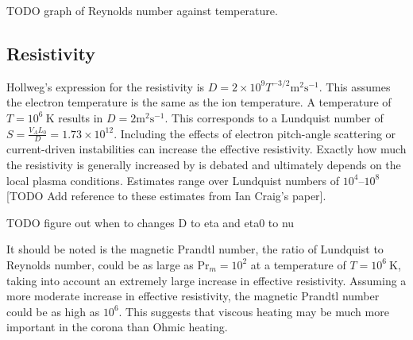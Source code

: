TODO graph of Reynolds number against temperature.

\subsection{Resistivity}

Hollweg's expression for the resistivity is $D = 2 \times 10^{9} T^{-3/2} \text{m}^2 \text{s}^{-1}$. This assumes the electron temperature is the same as the ion temperature. A temperature of $T=10^6\ \text{K}$ results in $D = 2 \text{m}^2 \text{s}^{-1}$. This corresponds to a Lundquist number of $S = \frac{V_A L_0}{D} = 1.73 \times 10^{12}$. Including the effects of electron pitch-angle scattering or current-driven instabilities can increase the effective resistivity. Exactly how much the resistivity is generally increased by is debated and ultimately depends on the local plasma conditions. Estimates range over Lundquist numbers of $10^{4}$--$10^{8}$ [TODO Add reference to these estimates from Ian Craig's paper].

TODO figure out when to changes D to eta and eta0 to nu

It should be noted is the magnetic Prandtl number, the ratio of Lundquist to Reynolds number, could be as large as $\text{Pr}_m = 10^2$ at a temperature of $T=10^6\ \text{K}$, taking into account an extremely large increase in effective resistivity. Assuming a more moderate increase in effective resistivity, the magnetic Prandtl number could be as high as $10^{6}$. This suggests that viscous heating may be much more important in the corona than Ohmic heating.

